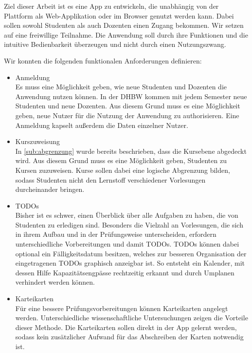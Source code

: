 Ziel dieser Arbeit ist es eine App zu entwickeln, die unabhängig von der Plattform als Web-Applikation oder im Browser genutzt werden kann.
Dabei sollen sowohl Studenten als auch Dozenten einen Zugang bekommen.
Wir setzen auf eine freiwillige Teilnahme. Die Anwendung soll durch ihre Funktionen und die intuitive Bedienbarkeit überzeugen und nicht durch einen Nutzungszwang.

Wir konnten die folgenden funktionalen Anforderungen definieren:
\begin{itemize}
    \item Anmeldung                         \\
        Es muss eine Möglichkeit geben, wie neue Studenten und Dozenten die Anwendung nutzen können.
        In der DHBW kommen mit jedem Semester neue Studenten und neue Dozenten.
        Aus diesem Grund muss es eine Möglichkeit geben, neue Nutzer für die Nutzung der Anwendung zu authorisieren.
        Eine Anmeldung kapselt außerdem die Daten einzelner Nutzer.
    \item Kurszuweisung                     \\
        In \autoref{sub:abgrenzung} wurde bereits beschrieben, dass die Kursebene abgedeckt wird.
        Aus diesem Grund muss es eine Möglichkeit geben, Studenten zu Kursen zuzuweisen.
        Kurse sollen dabei eine logische Abgrenzung bilden, sodass Studenten nicht den Lernstoff  verschiedener Vorlesungen durcheinander bringen.
    \item TODOs                             \\
        Bisher ist es schwer, einen Überblick über alle Aufgaben zu haben, die von Studenten zu erledigen sind.
        Besonders die Vielzahl an Vorlesungen, die sich in ihrem Aufbau und in der Prüfungsweise unterscheiden, erfordern unterschiedliche Vorbereitungen und damit TODOs.
        TODOs können dabei optional ein Fälligkeitsdatum besitzen, welches zur besseren Organisation der eingetragenen TODOs graphisch anzeigbar ist.
        So entsteht ein Kalender, mit dessen Hilfe  Kapazitätsengpässe rechtzeitig erkannt und durch Umplanen verhindert werden können.
    \item Karteikarten                      \\
        Für eine bessere Prüfungsvorbereitungen können Karteikarten angelegt werden. Unterschiedliche wissenschaftliche Untersuchungen zeigen die Vorteile dieser Methode. Die Karteikarten sollen direkt in der App gelernt werden, sodass kein zusätzlicher Aufwand für das Abschreiben der Karten notwendig ist.


\end{itemize}

